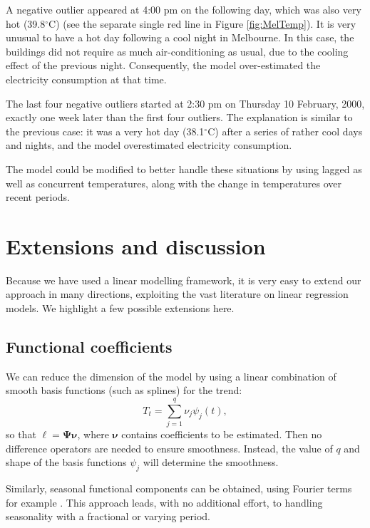 \documentclass[ijds,nonblindrev]{informs-ijds}
\begin{document}
A negative outlier appeared at 4:00 pm on the following day, which was also very hot (39.8\(^{\circ}\)C) (see the separate single red line in Figure \ref{fig:MelTemp}). It is very unusual to have a hot day following a cool night in Melbourne. In this case, the buildings did not require as much air-conditioning as usual, due to the cooling effect of the previous night. Consequently, the model over-estimated the electricity consumption at that time.

The last four negative outliers started at 2:30 pm on Thursday 10 February, 2000, exactly one week later than the first four outliers. The explanation is similar to the previous case: it was a very hot day (38.1\(^{\circ}\)C) after a series of rather cool days and nights, and the model overestimated electricity consumption.

The model could be modified to better handle these situations by using lagged as well as concurrent temperatures, along with the change in temperatures over recent periods.

\hypertarget{extensions-and-discussion}{%
\section{Extensions and discussion}\label{extensions-and-discussion}}

Because we have used a linear modelling framework, it is very easy to extend our approach in many directions, exploiting the vast literature on linear regression models. We highlight a few possible extensions here.

\hypertarget{sec:func-coeff}{%
\subsection{Functional coefficients}\label{sec:func-coeff}}

We can reduce the dimension of the model by using a linear combination of smooth basis functions (such as splines) for the trend:
\begin{equation}
  \label{l_t}
  T_t = \sum_{j=1}^{q}\nu_j \psi_j(t),
\end{equation}
so that \(\bm\ell = \bm{\Psi}\bm{\nu}\), where \(\bm{\nu}\) contains coefficients to be estimated. Then no difference operators are needed to ensure smoothness. Instead, the value of \(q\) and shape of the basis functions \(\psi_j\) will determine the smoothness.

Similarly, seasonal functional components can be obtained, using Fourier terms for example \citep[reminiscent of][]{de2011forecasting}. This approach leads, with no additional effort, to handling seasonality with a fractional or varying period.
\end{document}
